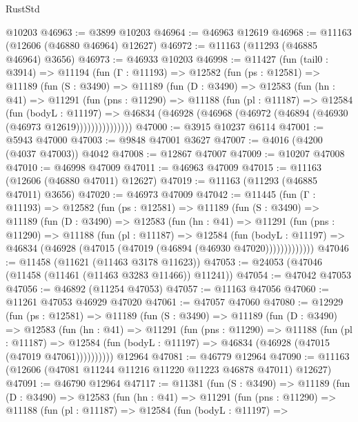 \begin{lexlean}{RustStd}
\begin{coremodule}
    @10203
@46963 := @3899 @10203
@46964 := @46963 @12619
@46968 := @11163 (@12606 (@46880 @46964) @12627)
@46972 := @11163 (@11293 (@46885 @46964) @3656)
@46973 := @46933 @10203
@46998 := @11427
    (fun (tail0 : @3914) =>
    @11194
      (fun (Γ : @11193) =>
      @12582
        (fun (ps : @12581) =>
        @11189
          (fun (S : @3490) =>
          @11189
            (fun (D : @3490) =>
            @12583
              (fun (hn : @41) =>
              @11291
                (fun (pns : @11290) =>
                @11188
                  (fun (pl : @11187) =>
                  @12584
                    (fun (bodyL : @11197) =>
                    @46834 (@46928 (@46968 (@46972 (@46894 (@46930 (@46973 @12619)))))))))))))))
@47000 := @3915 @10237 @6114
@47001 := @5943 @47000
@47003 := @9848 @47001 @3627
@47007 := @4016 (@4200 (@4037 @47003)) @4042
@47008 := @12867 @47007
@47009 := @10207 @47008
@47010 := @46998 @47009
@47011 := @46963 @47009
@47015 := @11163 (@12606 (@46880 @47011) @12627)
@47019 := @11163 (@11293 (@46885 @47011) @3656)
@47020 := @46973 @47009
@47042 := @11445
    (fun (Γ : @11193) =>
    @12582
      (fun (ps : @12581) =>
      @11189
        (fun (S : @3490) =>
        @11189
          (fun (D : @3490) =>
          @12583
            (fun (hn : @41) =>
            @11291
              (fun (pns : @11290) =>
              @11188
                (fun (pl : @11187) =>
                @12584
                  (fun (bodyL : @11197) =>
                  @46834 (@46928 (@47015 (@47019 (@46894 (@46930 @47020)))))))))))))
@47046 := @11458 (@11621 (@11463 @3178 @11623))
@47053 := @24053 (@47046 (@11458 (@11461 (@11463 @3283 @11466)) @11241))
@47054 := @47042 @47053
@47056 := @46892 (@11254 @47053)
@47057 := @11163 @47056
@47060 := @11261 @47053 @46929 @47020
@47061 := @47057 @47060
@47080 := @12929
    (fun (ps : @12581) =>
    @11189
      (fun (S : @3490) =>
      @11189
        (fun (D : @3490) =>
        @12583
          (fun (hn : @41) =>
          @11291
            (fun (pns : @11290) =>
            @11188
              (fun (pl : @11187) =>
              @12584 (fun (bodyL : @11197) => @46834 (@46928 (@47015 (@47019 @47061))))))))))
    @12964
@47081 := @46779 @12964
@47090 := @11163 (@12606 (@47081 @11244 @11216 @11220 @11223 @46878 @47011) @12627)
@47091 := @46790 @12964
@47117 := @11381
    (fun (S : @3490) =>
    @11189
      (fun (D : @3490) =>
      @12583
        (fun (hn : @41) =>
        @11291
          (fun (pns : @11290) =>
          @11188
            (fun (pl : @11187) =>
            @12584
              (fun (bodyL : @11197) =>

\end{coremodule}
\end{lexlean}

